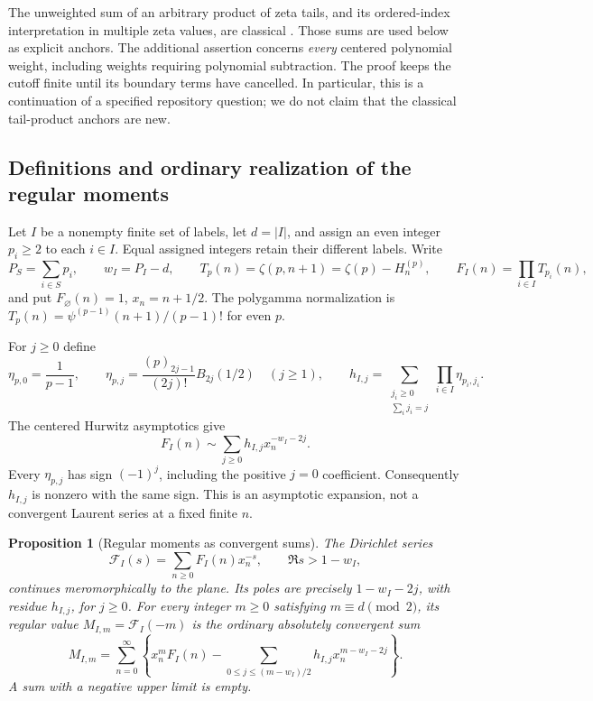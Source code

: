 \documentclass[11pt,letterpaper]{article}
\numberwithin{equation}{section}
\newtheorem{proposition}[theorem]{Proposition}
\theoremstyle{definition}
\theoremstyle{remark}
\begin{document}
The unweighted sum of an arbitrary product of zeta tails, and its
ordered-index interpretation in multiple zeta values, are classical
\cite{Hoffman}. Those sums are used below as explicit anchors.
The additional assertion concerns \emph{every} centered polynomial
weight, including weights requiring polynomial subtraction. The proof
keeps the cutoff finite until its boundary terms have cancelled.
In particular, this is a continuation of a specified repository question;
we do not claim that the classical tail-product anchors are new.

\subsection{Definitions and ordinary realization of the regular moments}

Let $I$ be a nonempty finite set of labels, let $d=|I|$, and assign an
even integer $p_i\ge2$ to each $i\in I$. Equal assigned integers retain
their different labels. Write
\[
 P_S=\sum_{i\in S}p_i,\qquad w_I=P_I-d,\qquad
 T_p(n)=\zeta(p,n+1)=\zeta(p)-H_n^{(p)},
 \qquad F_I(n)=\prod_{i\in I}T_{p_i}(n),
\]
and put $F_\varnothing(n)=1$, $x_n=n+1/2$. The polygamma normalization is
$T_p(n)=\psi^{(p-1)}(n+1)/(p-1)!$ for even $p$.

For $j\ge0$ define
\begin{equation}\label{mtp:eta}
 \eta_{p,0}=\frac1{p-1},\qquad
 \eta_{p,j}=\frac{(p)_{2j-1}}{(2j)!}B_{2j}(1/2)\quad(j\ge1),
 \qquad
 h_{I,j}=\sum_{\substack{j_i\ge0\\\sum_i j_i=j}}
                        \prod_{i\in I}\eta_{p_i,j_i}.
\end{equation}
The centered Hurwitz asymptotics \cite[Section 25.11]{DLMF} give
\begin{equation}\label{mtp:asymptotic}
                F_I(n)\sim\sum_{j\ge0}h_{I,j}x_n^{-w_I-2j}.
\end{equation}
Every $\eta_{p,j}$ has sign $(-1)^j$, including the positive $j=0$
coefficient. Consequently $h_{I,j}$ is nonzero with the same sign.
This is an asymptotic expansion, not a convergent Laurent series at a
fixed finite $n$.

\begin{proposition}[Regular moments as convergent sums]
\label{mtp:ordinary}
The Dirichlet series
\[
                 \mathcal F_I(s)=\sum_{n\ge0}F_I(n)x_n^{-s},
                    \qquad \Re s>1-w_I,
\]
continues meromorphically to the plane. Its poles are precisely
$1-w_I-2j$, with residue $h_{I,j}$, for $j\ge0$. For every integer
$m\ge0$ satisfying $m\equiv d\pmod2$, its regular value
$M_{I,m}=\mathcal F_I(-m)$ is the ordinary absolutely convergent sum
\begin{equation}\label{mtp:ordinary-formula}
 \boxed{M_{I,m}=\sum_{n=0}^{\infty}\left\{
       x_n^mF_I(n)
       -\sum_{0\le j\le(m-w_I)/2}h_{I,j}x_n^{m-w_I-2j}
                                     \right\}.}
\end{equation}
A sum with a negative upper limit is empty.
\end{proposition}
\end{document}
